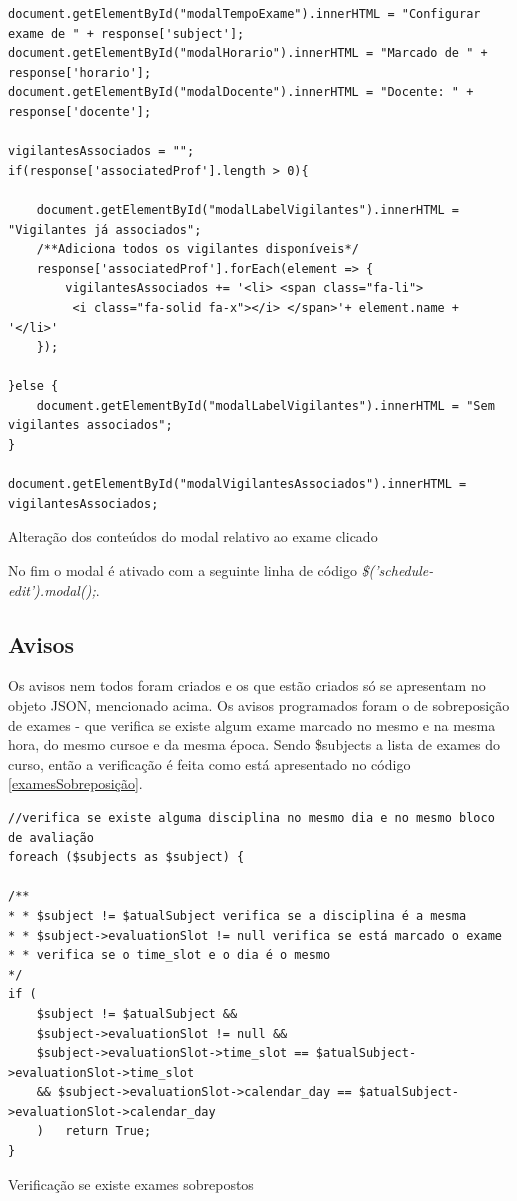 \documentclass[12pt, twoside]{report}
\begin{document}
	\begin{listing}[H]
	\begin{verbatim}
document.getElementById("modalTempoExame").innerHTML = "Configurar exame de " + response['subject'];
document.getElementById("modalHorario").innerHTML = "Marcado de " + response['horario'];
document.getElementById("modalDocente").innerHTML = "Docente: " + response['docente'];
	
vigilantesAssociados = "";
if(response['associatedProf'].length > 0){
	
	document.getElementById("modalLabelVigilantes").innerHTML = "Vigilantes já associados";
	/**Adiciona todos os vigilantes disponíveis*/
	response['associatedProf'].forEach(element => {
		vigilantesAssociados += '<li> <span class="fa-li">
		 <i class="fa-solid fa-x"></i> </span>'+ element.name + '</li>'
	});
		
}else {
	document.getElementById("modalLabelVigilantes").innerHTML = "Sem vigilantes associados";
}
	
document.getElementById("modalVigilantesAssociados").innerHTML = vigilantesAssociados;
\end{verbatim}
\caption{Alteração dos conteúdos do modal relativo ao exame clicado}
\label{modal}
\end{listing}

No fim o modal é ativado com a seguinte linha de código \textit{ \$('schedule-edit').modal();}.
	\subsection{Avisos}
	\label{avisosSeccao}
	
	Os avisos nem todos foram criados e os que estão criados só se apresentam no objeto JSON, mencionado acima. Os avisos programados foram o de sobreposição de exames - que verifica se existe algum exame marcado no mesmo e na mesma hora, do mesmo cursoe e da mesma época. Sendo \$subjects a lista de exames do curso, então a verificação é feita como está apresentado no código \ref{examesSobreposição}.
	
		\begin{listing}[H]
		\begin{verbatim}
//verifica se existe alguma disciplina no mesmo dia e no mesmo bloco de avaliação
foreach ($subjects as $subject) {
				
/**
* * $subject != $atualSubject verifica se a disciplina é a mesma
* * $subject->evaluationSlot != null verifica se está marcado o exame
* * verifica se o time_slot e o dia é o mesmo
*/
if (
	$subject != $atualSubject &&
	$subject->evaluationSlot != null &&
	$subject->evaluationSlot->time_slot == $atualSubject->evaluationSlot->time_slot
	&& $subject->evaluationSlot->calendar_day == $atualSubject->evaluationSlot->calendar_day
	) 	return True;
}
		\end{verbatim}
		\caption{Verificação se existe exames sobrepostos}
		\label{examesSobreposição}
	\end{listing}
	
\end{document}
